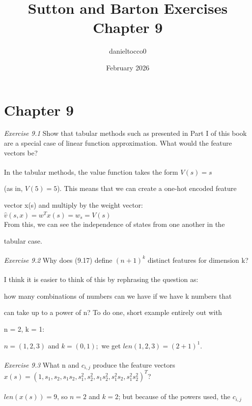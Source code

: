 \documentclass{article}
\title{Sutton and Barton Exercises Chapter 9}
\author{danieltocco0 }
\date{February 2026}
\begin{document}
\maketitle

\section{Chapter 9}
\textit{Exercise 9.1} Show that tabular methods such as presented in Part I of this book are a
special case of linear function approximation. What would the feature vectors be?
\\
\\

In the tabular methods, the value function takes the form $V(s) = s$ 

(as in, $V(5) = 5$). This means that we can create a one-hot encoded feature 

vector x(s) and multiply by the weight vector:
\\

$\hat{v}(s, x) = w^{T} x(s) = w_{s} = V(s)$
\\

From this, we can see the independence of states from one another in the 

tabular case.
\\\\
\textit{Exercise 9.2} Why does (9.17) define $(n + 1)^{k}$ distinct features for dimension k?
\\
\\

I think it is easier to think of this by rephrasing the question as:

how many combinations of numbers can we have if we have k numbers that

can take up to a power of n? To do one, short example entirely out with

n = 2, k = 1: 

$n = (1, 2, 3)$ and $k = (0, 1);$ we get $len(1, 2, 3) = (2 + 1)^{1}.$
\\\\
\textit{Exercise 9.3} What n and $c_{i,j}$ produce the feature vectors $x(s) = (1, s_{1}, s_{2}, s_{1}s_{2}, s_{1}^{2}, s_{2}^{2}, s_{1}s_{2}^{2}, s_{1}^{2}s_{2}, s_{1}^{2}s_{2}^{2})^{T}$? 
\\
\\

$len(x(s)) = 9$, so $n = 2$ and $k = 2$; but because of the powers used, the $c_{i, j}$ 
\end{document}
